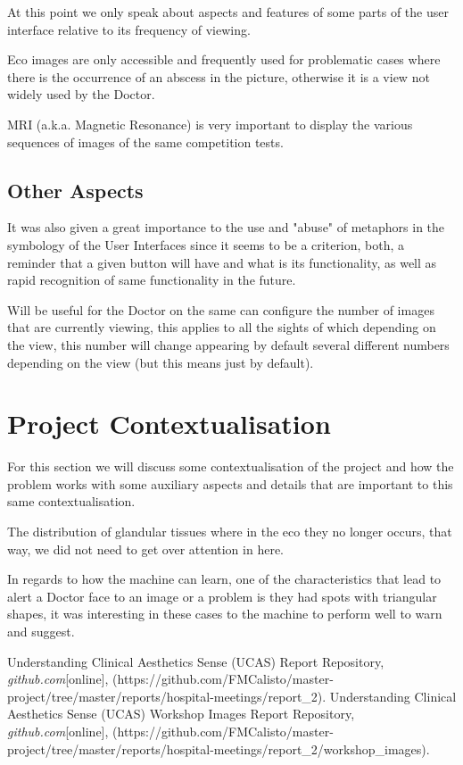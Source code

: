 At this point we only speak about aspects and features of some parts of the user interface relative to its frequency of viewing.

Eco images are only accessible and frequently used for problematic cases where there is the occurrence of an abscess in the picture, otherwise it is a view not widely used by the Doctor.

MRI (a.k.a. Magnetic Resonance) is very important to display the various sequences of images of the same competition tests.

\subsection{Other Aspects}

It was also given a great importance to the use and "abuse" of metaphors in the symbology of the User Interfaces since it seems to be a criterion, both, a reminder that a given button will have and what is its functionality, as well as rapid recognition of same functionality in the future.

Will be useful for the Doctor on the same can configure the number of images that are currently viewing, this applies to all the sights of which depending on the view, this number will change appearing by default several different numbers depending on the view (but this means just by default).


\section{Project Contextualisation}

For this section we will discuss some contextualisation of the project and how the problem works with some auxiliary aspects and details that are important to this same contextualisation.

The distribution of glandular tissues where in the eco they no longer occurs, that way, we did not need to get over attention in here.

In regards to how the machine can learn, one of the characteristics that lead to alert a Doctor face to an image or a problem is they had spots with triangular shapes, it was interesting in these cases to the machine to perform well to warn and suggest.


\begin{thebibliography}{}
 Understanding Clinical Aesthetics Sense (UCAS) Report Repository, \emph{github.com}[online], (https://github.com/FMCalisto/master-project/tree/master/reports/hospital-meetings/report\_2).
 Understanding Clinical Aesthetics Sense (UCAS) Workshop Images Report Repository, \emph{github.com}[online], (https://github.com/FMCalisto/master-project/tree/master/reports/hospital-meetings/report\_2/workshop\_images).
\end{thebibliography}



